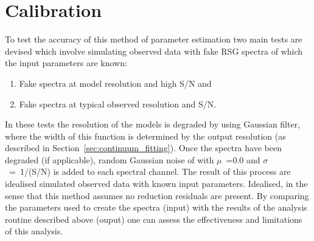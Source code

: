 


\section{Calibration} %
\label{sec:calibration}


To test the accuracy of this method of parameter estimation two main tests are devised which involve simulating observed data with fake RSG spectra of which the input parameters are known:

\begin{enumerate}
    \item Fake spectra at model resolution and high S/N and
    \item Fake spectra at typical observed resolution and S/N.
\end{enumerate}

In these tests the resolution of the models is degraded by using Gaussian filter, where the width of this function is determined by the output resolution (as described in Section~\ref{sec:continuum_fitting}).
Once the spectra have been degraded (if applicable), random Gaussian noise of with $\mu$~=0.0 and $\sigma$~=~1/(S/N) is added to each spectral channel.
The result of this process are idealised simulated observed data with known input parameters.
Idealised, in the sense that this method assumes no reduction residuals are present.
By comparing the parameters used to create the spectra (input) with the results of the analysis routine described above (ouput) one can assess the effectiveness and limitations of this analysis.

